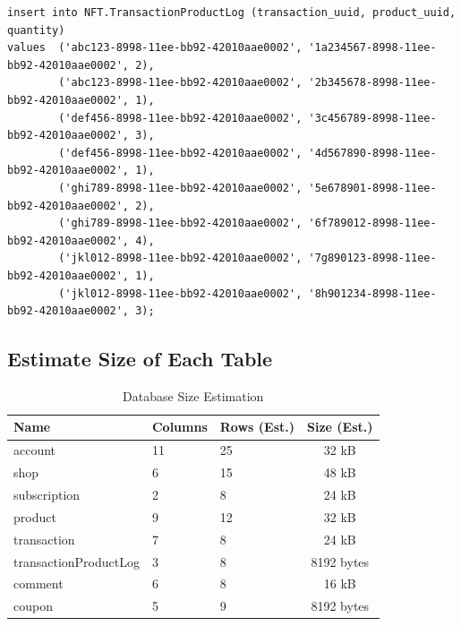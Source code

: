 \documentclass[a4paper, 12pt]{article}
\newcommand\NormalFont{\fontsize{12pt}{16pt}\selectfont}
\begin{document}
\begin{verbatim}
insert into NFT.TransactionProductLog (transaction_uuid, product_uuid, quantity)
values  ('abc123-8998-11ee-bb92-42010aae0002', '1a234567-8998-11ee-bb92-42010aae0002', 2),
        ('abc123-8998-11ee-bb92-42010aae0002', '2b345678-8998-11ee-bb92-42010aae0002', 1),
        ('def456-8998-11ee-bb92-42010aae0002', '3c456789-8998-11ee-bb92-42010aae0002', 3),
        ('def456-8998-11ee-bb92-42010aae0002', '4d567890-8998-11ee-bb92-42010aae0002', 1),
        ('ghi789-8998-11ee-bb92-42010aae0002', '5e678901-8998-11ee-bb92-42010aae0002', 2),
        ('ghi789-8998-11ee-bb92-42010aae0002', '6f789012-8998-11ee-bb92-42010aae0002', 4),
        ('jkl012-8998-11ee-bb92-42010aae0002', '7g890123-8998-11ee-bb92-42010aae0002', 1),
        ('jkl012-8998-11ee-bb92-42010aae0002', '8h901234-8998-11ee-bb92-42010aae0002', 3);
\end{verbatim}
\newpage
\NormalFont
\subsection{Estimate Size of Each Table}
\begin{table}[h]
    \begin{tabular}{|p{5cm}|p{2cm}|p{2.5cm}|c|}
        \hline
        \textbf{Name} & \textbf{Columns} & \textbf{Rows (Est.)} & \textbf{Size (Est.)} \\
        \hline
        account & 11 & 25 & 32 kB \\
        \hline
        shop & 6 & 15 & 48 kB \\
        \hline
        subscription   & 2 & 8 & 24 kB \\
        \hline
        product & 9 & 12 & 32 kB \\
        \hline
        transaction & 7 & 8 & 24 kB \\
        \hline
        transactionProductLog & 3 & 8 & 8192 bytes \\
        \hline
        comment & 6 & 8 & 16 kB \\
        \hline
        coupon & 5 & 9 & 8192 bytes \\
        \hline
    \end{tabular}
    \caption{Database Size Estimation}
    \label{tab:database-size-estimation}
\end{table}
\end{document}
